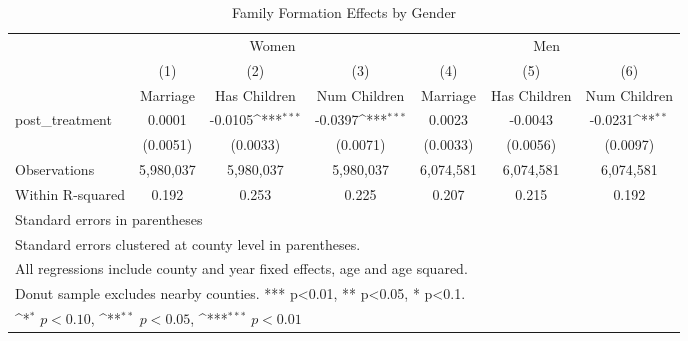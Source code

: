 \begin{table}[htbp]\centering
\def\sym#1{\ifmmode^{#1}\else\(^{#1}\)\fi}
\caption{Family Formation Effects by Gender}
\begin{tabular}{l*{6}{c}}
\hline\hline
            &\multicolumn{3}{c}{Women}                                        &\multicolumn{3}{c}{Men}                                          \\\cmidrule(lr){2-4}\cmidrule(lr){5-7}
            &\multicolumn{1}{c}{(1)}&\multicolumn{1}{c}{(2)}&\multicolumn{1}{c}{(3)}&\multicolumn{1}{c}{(4)}&\multicolumn{1}{c}{(5)}&\multicolumn{1}{c}{(6)}\\
            &\multicolumn{1}{c}{Marriage}&\multicolumn{1}{c}{Has Children}&\multicolumn{1}{c}{Num Children}&\multicolumn{1}{c}{Marriage}&\multicolumn{1}{c}{Has Children}&\multicolumn{1}{c}{Num Children}\\
\hline
post\_treatment&      0.0001         &     -0.0105\sym{***}&     -0.0397\sym{***}&      0.0023         &     -0.0043         &     -0.0231\sym{**} \\
            &    (0.0051)         &    (0.0033)         &    (0.0071)         &    (0.0033)         &    (0.0056)         &    (0.0097)         \\
\hline
Observations&   5,980,037         &   5,980,037         &   5,980,037         &   6,074,581         &   6,074,581         &   6,074,581         \\
Within R-squared&       0.192         &       0.253         &       0.225         &       0.207         &       0.215         &       0.192         \\
\hline\hline
\multicolumn{7}{l}{\footnotesize Standard errors in parentheses}\\
\multicolumn{7}{l}{\footnotesize Standard errors clustered at county level in parentheses.}\\
\multicolumn{7}{l}{\footnotesize All regressions include county and year fixed effects, age and age squared.}\\
\multicolumn{7}{l}{\footnotesize Donut sample excludes nearby counties. *** p<0.01, ** p<0.05, * p<0.1.}\\
\multicolumn{7}{l}{\footnotesize \sym{*} \(p<0.10\), \sym{**} \(p<0.05\), \sym{***} \(p<0.01\)}\\
\end{tabular}
\end{table}
